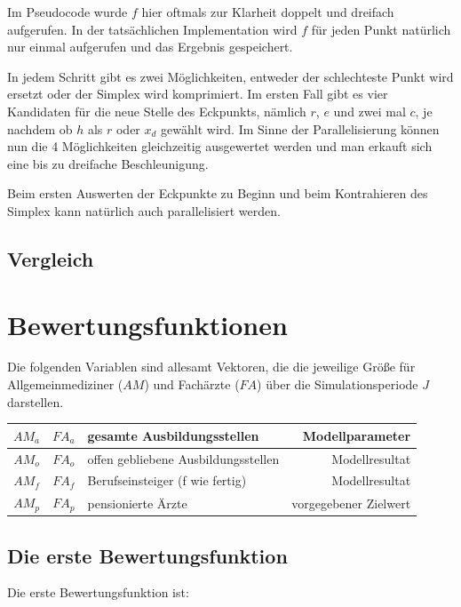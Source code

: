 \documentclass[a4paper,12pt]{article}
\begin{document}
Im Pseudocode wurde $f$ hier oftmals zur Klarheit doppelt und dreifach aufgerufen. In der tatsächlichen Implementation wird $f$ für jeden Punkt natürlich nur einmal aufgerufen und das Ergebnis gespeichert.

In jedem Schritt gibt es zwei Möglichkeiten, entweder der schlechteste Punkt wird ersetzt oder der Simplex wird komprimiert. Im ersten Fall gibt es vier Kandidaten für die neue Stelle des Eckpunkts, nämlich $r$, $e$ und zwei mal $c$, je nachdem ob $h$ als $r$ oder $x_d$ gewählt wird. Im Sinne der Parallelisierung können nun die 4 Möglichkeiten gleichzeitig ausgewertet werden und man erkauft sich eine bis zu dreifache Beschleunigung. 

Beim ersten Auswerten der Eckpunkte zu Beginn und beim Kontrahieren des Simplex kann natürlich auch parallelisiert werden. 


\subsection{Vergleich}

\newpage

\section{Bewertungsfunktionen}

Die folgenden Variablen sind allesamt Vektoren, die die jeweilige Größe für Allgemeinmediziner ($AM$) und Fachärzte ($FA$) über die Simulationsperiode $J$ darstellen.

\begin{center}
\begin{tabular}{ | c | c | l | r |}
\hline
$AM_a$ & $FA_a$ & gesamte Ausbildungsstellen & Modellparameter \\ \hline
$AM_o$ & $FA_o$ & offen gebliebene Ausbildungsstellen & Modellresultat \\ \hline
$AM_f$ & $FA_f$ & Berufseinsteiger (f wie fertig) & Modellresultat \\ \hline
$AM_p$ & $FA_p$ & pensionierte Ärzte & vorgegebener Zielwert \\ \hline
\end{tabular}
\end{center}

\subsection{Die erste Bewertungsfunktion}

Die erste Bewertungsfunktion ist:
\end{document}
